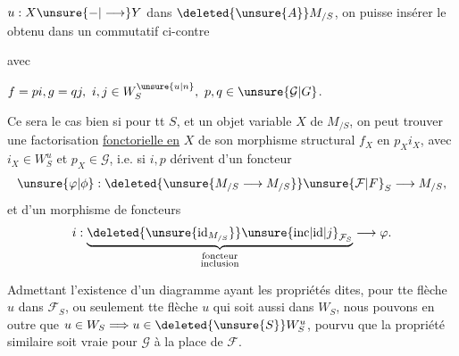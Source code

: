 
$u:X\unsure{\mathbin{-}|\longrightarrow}Y$ dans $\deleted{\unsure{A}}M_{/S}$, on puisse insérer le   obtenu  dans un    commutatif ci-contre


avec


$f=pi,g=qj,\ i,j\in W_S^{\unsure{u|n}},\ p,q\in\unsure{\mathcal{G}|G}$.

Ce sera le cas  bien  si pour tt $S$,  et un objet variable $X$ de $M_{/S}$, on peut trouver une factorisation \uline{fonctorielle en} $X$ de son morphisme structural $f_X$ en $p_X i_X$, avec $i_X\in W_S^u$ et $p_X\in\mathcal{G}$, i.e. si $i,p$ dérivent d'un foncteur
\[
 \unsure{\varphi|\phi}:\deleted{\unsure{M_{/S}\longrightarrow M_{/S}}}\unsure{\mathcal{F}|F}_S\longrightarrow M_{/S},
\]
et d'un morphisme de foncteurs
\[
 i:\underset{\substack{\text{foncteur}\\\text{inclusion}}}{\underbrace{\deleted{\unsure{\mathrm{id}_{M_{/S}}}}\unsure{\mathrm{inc}|\mathrm{id}|j}_{\mathcal{F}_S}}}\longrightarrow\varphi.
\]

Admettant l'existence d'un  diagramme ayant les propriétés dites, pour tte flèche $u$ dans $\mathcal{F}_S$, ou seulement tte flèche $u$ qui soit aussi dans $W_S$, nous pouvons  en outre que $u\in W_S\Longrightarrow u\in\deleted{\unsure{S}}W_S^u$, pourvu que la propriété similaire soit vraie pour $\mathcal{G}$ à la place de $\mathcal{F}$.
